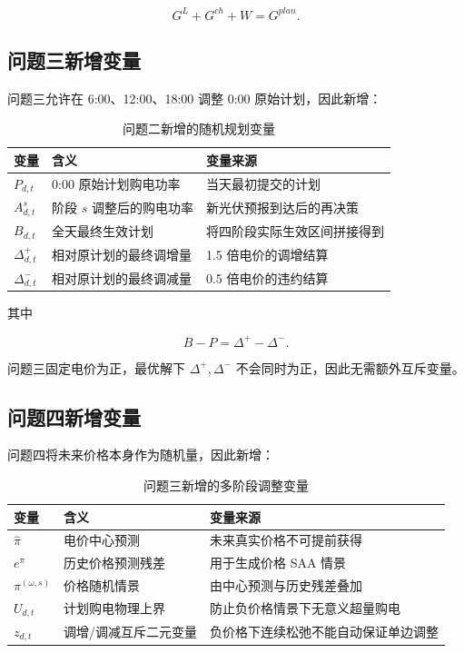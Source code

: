 \[
G^L+G^{ch}+W=G^{plan}.
\]

\subsection{问题三新增变量}

问题三允许在 6:00、12:00、18:00 调整 0:00 原始计划，因此新增：

\begin{table}[H]
\centering
{}
\begin{tabular}{lll}
\toprule
变量 & 含义 & 变量来源 \\
\midrule
\(P_{d,t}\) & 0:00 原始计划购电功率 & 当天最初提交的计划 \\
\(A^s_{d,t}\) & 阶段 \(s\) 调整后的购电功率 & 新光伏预报到达后的再决策 \\
\(B_{d,t}\) & 全天最终生效计划 & 将四阶段实际生效区间拼接得到 \\
\(\Delta^+_{d,t}\) & 相对原计划的最终调增量 & 1.5 倍电价的调增结算 \\
\(\Delta^-_{d,t}\) & 相对原计划的最终调减量 & 0.5 倍电价的违约结算 \\
\bottomrule
\end{tabular}
\caption{问题二新增的随机规划变量}
\label{tab:5}
\end{table}

其中

\[
B-P=\Delta^+-\Delta^-.
\]

问题三固定电价为正，最优解下 \(\Delta^+,\Delta^-\) 不会同时为正，因此无需额外互斥变量。

\subsection{问题四新增变量}

问题四将未来价格本身作为随机量，因此新增：

\begin{table}[H]
\centering
{}
\begin{tabular}{lll}
\toprule
变量 & 含义 & 变量来源 \\
\midrule
\(\hat\pi\) & 电价中心预测 & 未来真实价格不可提前获得 \\
\(e^\pi\) & 历史价格预测残差 & 用于生成价格 SAA 情景 \\
\(\pi^{(\omega,s)}\) & 价格随机情景 & 由中心预测与历史残差叠加 \\
\(U_{d,t}\) & 计划购电物理上界 & 防止负价格情景下无意义超量购电 \\
\(z_{d,t}\) & 调增/调减互斥二元变量 & 负价格下连续松弛不能自动保证单边调整 \\
\bottomrule
\end{tabular}
\caption{问题三新增的多阶段调整变量}
\label{tab:6}
\end{table}

